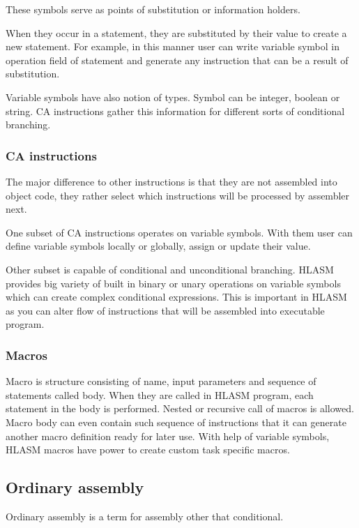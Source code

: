 These symbols serve as points of substitution or information holders. 

When they occur in a statement, they are substituted by their value to create a new statement. For example, in this manner user can write variable symbol in operation field of statement and generate any instruction that can be a result of substitution.

Variable symbols have also notion of types. Symbol can be integer, boolean or string. CA instructions gather this information for different sorts of conditional branching.

\subsubsection{CA instructions}

The major difference to other instructions is that they are not assembled into object code, they rather select which instructions will be processed by assembler next.

One subset of CA instructions operates on variable symbols. With them user can define variable symbols locally or globally, assign or update their value.

Other subset is capable of conditional and unconditional branching. HL\-ASM provides big variety of built in binary or unary operations on variable symbols which can create complex conditional expressions. This is important in HLASM as you can alter flow of instructions that will be assembled into executable program.

\subsubsection{Macros}
Macro is structure consisting of name, input parameters and sequence of statements called body. When they are called in HLASM program, each statement in the body is performed. Nested or recursive call of macros is allowed. Macro body can even contain such sequence of instructions that it can generate another macro definition ready for later use. With help of variable symbols, HLASM macros have power to create custom task specific macros.

\subsection{Ordinary assembly}

Ordinary assembly is a term for assembly other that conditional. 

